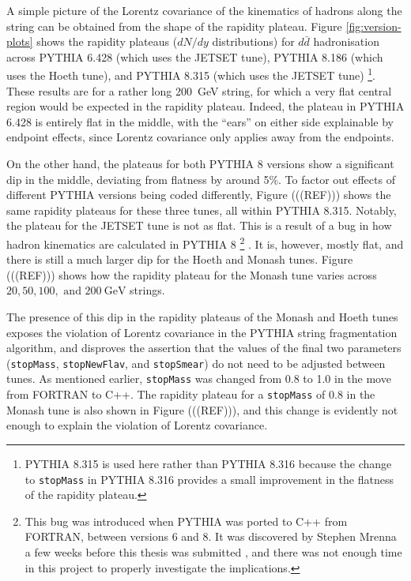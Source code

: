 \documentclass[12pt,a4paper]{report}
\begin{document}
A simple picture of the Lorentz covariance of the kinematics of hadrons along the string can be obtained from the shape of the rapidity plateau. Figure \ref{fig:version-plots} shows the rapidity plateaus ($dN/dy$ distributions) for $d\bar{d}$ hadronisation across PYTHIA 6.428 (which uses the JETSET tune), PYTHIA 8.186 (which uses the Hoeth tune), and PYTHIA 8.315 (which uses the JETSET tune) \footnote{PYTHIA 8.315 is used here rather than PYTHIA 8.316 because the change to \texttt{stopMass} in PYTHIA 8.316 provides a small improvement in the flatness of the rapidity plateau.}. These results are for a rather long \qty{200}{\giga\electronvolt} string, for which a very flat central region would be expected in the rapidity plateau. Indeed, the plateau in PYTHIA 6.428 is entirely flat in the middle, with the ``ears'' on either side explainable by endpoint effects, since Lorentz covariance only applies away from the endpoints.

On the other hand, the plateaus for both PYTHIA 8 versions show a significant dip in the middle, deviating from flatness by around 5\%. To factor out effects of different PYTHIA versions being coded differently, Figure (((REF))) shows the same rapidity plateaus for these three tunes, all within PYTHIA 8.315. Notably, the plateau for the JETSET tune is not as flat. This is a result of a bug in how hadron kinematics are calculated in PYTHIA 8 \footnote{This bug was introduced when PYTHIA was ported to C++ from FORTRAN, between versions 6 and 8. It was discovered by Stephen Mrenna a few weeks before this thesis was submitted \cite{steve}, and there was not enough time in this project to properly investigate the implications.} \cite{steve}. It is, however, mostly flat, and there is still a much larger dip for the Hoeth and Monash tunes. Figure (((REF))) shows how the rapidity plateau for the Monash tune varies across $20, 50, 100,\text{ and } \qty{200}{\giga\electronvolt}$ strings.

The presence of this dip in the rapidity plateaus of the Monash and Hoeth tunes exposes the violation of Lorentz covariance in the PYTHIA string fragmentation algorithm, and disproves the assertion that the values of the final two parameters (\texttt{stopMass}, \texttt{stopNewFlav}, and \texttt{stopSmear}) do not need to be adjusted between tunes. As mentioned earlier, \texttt{stopMass} was changed from 0.8 to 1.0 in the move from FORTRAN to C++. The rapidity plateau for a \texttt{stopMass} of 0.8 in the Monash tune is also shown in Figure (((REF))), and this change is evidently not enough to explain the violation of Lorentz covariance.
\end{document}

